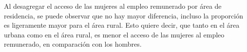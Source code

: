 Al desagregar el acceso de las mujeres al empleo remunerado por área de residencia, se puede observar que no hay mayor diferencia, incluso la proporción es ligeramente mayor para el área rural. Esto quiere decir, que tanto en el área urbana como en el área rural, es menor el acceso de las mujeres al empleo remunerado, en comparación con los hombres.